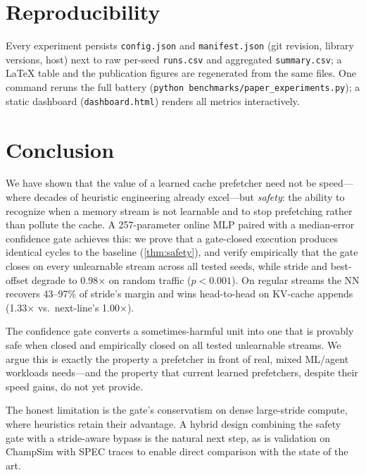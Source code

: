 \documentclass[conference]{IEEEtran}
\begin{document}
\section{Reproducibility}
\label{sec:reproducibility}

Every experiment persists \texttt{config.json} and \texttt{manifest.json} (git revision,
library versions, host) next to raw per-seed \texttt{runs.csv} and aggregated
\texttt{summary.csv}; a \LaTeX{} table and the publication figures are regenerated from
the same files. One command reruns the full battery
(\texttt{python benchmarks/paper\_experiments.py}); a static dashboard
(\texttt{dashboard.html}) renders all metrics interactively.

\section{Conclusion}

We have shown that the value of a learned cache prefetcher need not be speed---where
decades of heuristic engineering already excel---but \emph{safety}: the ability to
recognize when a memory stream is not learnable and to stop prefetching rather than
pollute the cache. A 257-parameter online MLP paired with a median-error confidence
gate achieves this: we prove that a gate-closed execution produces identical cycles
to the baseline (\cref{thm:safety}), and verify empirically that the gate closes on
every unlearnable stream across all tested seeds, while stride and best-offset
degrade to 0.98$\times$ on random traffic ($p < 0.001$). On regular streams the NN
recovers 43--97\% of stride's margin and wins head-to-head on KV-cache appends
(1.33$\times$ vs.\ next-line's 1.00$\times$).

The confidence gate converts a sometimes-harmful unit into one that is provably
safe when closed and empirically closed on all tested unlearnable streams. We argue
this is exactly the property a prefetcher in front of real, mixed ML/agent workloads
needs---and the property that current learned prefetchers, despite their speed gains,
do not yet provide.

The honest limitation is the gate's conservatism on dense large-stride compute, where
heuristics retain their advantage. A hybrid design combining the safety gate with a
stride-aware bypass is the natural next step, as is validation on ChampSim with
SPEC traces to enable direct comparison with the state of the art.
\end{document}
